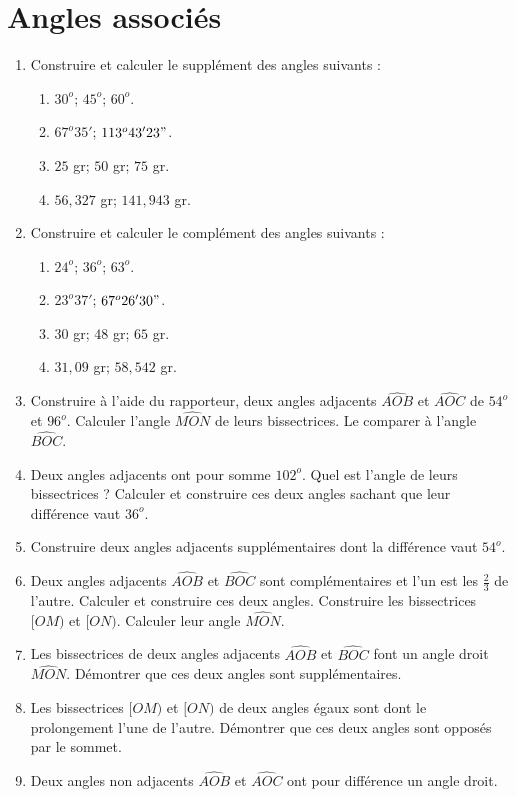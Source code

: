 
\chapter{Angles associés} 
\begin{enumerate}
\item Construire et calculer le supplément des angles suivants : 
\begin{enumerate}
\item $30^o$; $45^o$; $60^o$. 
\item $67^o35'$; $113^o43'23"$. 
\item $25$ gr; $50$ gr; $75$ gr. 
\item $56,327$ gr; $141,943$ gr. 
\end{enumerate}
\item Construire et calculer le complément des angles suivants : 
\begin{enumerate}
\item $24^o$; $36^o$; $63^o$. 
\item $23^o37'$; $67^o26'30"$.
\item $30$ gr; $48$ gr; $65$ gr. 
\item $31,09$ gr; $58,542$ gr. 
\end{enumerate}
\item Construire à l'aide du rapporteur, deux angles adjacents $\widehat{AOB}$ et $\widehat{AOC}$ de $54^o$ et $96^o$. Calculer l'angle $\widehat{MON}$ de leurs bissectrices. Le comparer à l'angle $\widehat{BOC}$.
\item Deux angles adjacents ont pour somme $102^o$. Quel est l'angle de leurs bissectrices ? Calculer et construire ces deux angles sachant que leur différence vaut $36^o$. 
\item Construire deux angles adjacents supplémentaires dont la différence vaut $54^o$. 
\item Deux angles adjacents $\widehat{AOB}$ et $\widehat{BOC}$ sont complémentaires et l'un est les $\frac23$ de l'autre. Calculer et construire ces deux angles. Construire les bissectrices $[OM)$ et $[ON)$. Calculer leur angle $\widehat{MON}$. 
\item Les bissectrices de deux angles adjacents $\widehat{AOB}$ et $\widehat{BOC}$ font un angle droit $\widehat{MON}$. Démontrer que ces deux angles sont supplémentaires. 
\item Les bissectrices $[OM)$ et $[ON)$ de deux angles égaux sont dont le prolongement l'une de l'autre. Démontrer que ces deux angles sont opposés par le sommet. 
\item Deux angles non adjacents $\widehat{AOB}$ et $\widehat{AOC}$ ont pour différence un angle droit. 

\end{enumerate}
